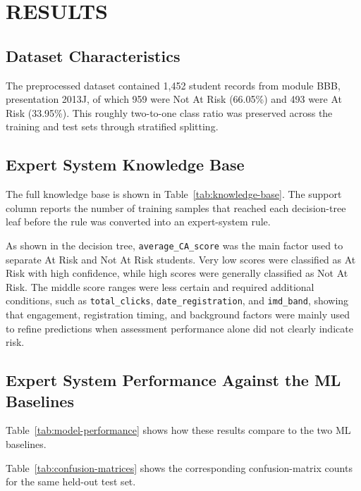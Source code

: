 \section{RESULTS}

\subsection{Dataset Characteristics}

The preprocessed dataset contained 1,452 student records from module BBB, presentation 2013J, of which 959 were Not At Risk (66.05\%) and 493 were At Risk (33.95\%). This roughly two-to-one class ratio was preserved across the training and test sets through stratified splitting.

\subsection{Expert System Knowledge Base}

The full knowledge base is shown in Table~\ref{tab:knowledge-base}. The support column reports the number of training samples that reached each decision-tree leaf before the rule was converted into an expert-system rule.



As shown in the decision tree, \texttt{average\_CA\_score} was the main factor used to separate At Risk and Not At Risk students. Very low scores were classified as At Risk with high confidence, while high scores were generally classified as Not At Risk. The middle score ranges were less certain and required additional conditions, such as \texttt{total\_clicks}, \texttt{date\_registration}, and \texttt{imd\_band}, showing that engagement, registration timing, and background factors were mainly used to refine predictions when assessment performance alone did not clearly indicate risk.

\subsection{Expert System Performance Against the ML Baselines}

Table~\ref{tab:model-performance} shows how these results compare to the two ML baselines.



Table~\ref{tab:confusion-matrices} shows the corresponding confusion-matrix counts for the same held-out test set.

